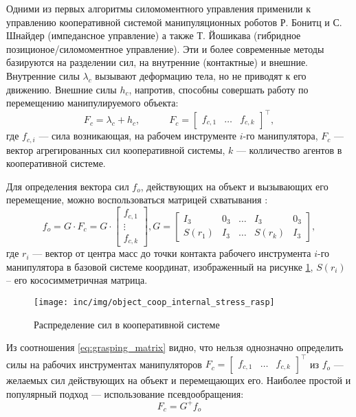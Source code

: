 Одними из первых алгоритмы силомоментного управления применили к управлению кооперативной системой манипуляционных роботов Р. Бонитц \cite{Bonitz1996} и С. Шнайдер \cite{Schneider1989}(импедансное управление) а также Т. Йошикава \cite{Yoshikawa1990}(гибридное позиционое/силомоментное управление). Эти и более современные методы базируются на разделении сил, на внутренние (контактные) и внешние. Внутренние силы $\lambda_c$ вызывают деформацию тела, но не приводят к его движению. Внешние силы $h_c$, напротив, способны совершать работу по перемещению манипулируемого объекта:
\begin{equation}
  F_c = \lambda_c + h_c, \qquad \quad F_c = \begin{bmatrix} f_{c,1} & \dots & f_{c,k} \end{bmatrix}^\top,
\end{equation}
где $f_{c,i}$ --- сила возникающая, на рабочем инструменте $i$-го манипулятора, $F_c$ --- вектор агрегированных сил кооперативной системы, $k$ --- колличество агентов в кооперативной системе.

Для определения вектора сил $f_o$, действующих на объект и вызывающих его перемещение, можно воспользоваться матрицей схватывания \cite{AzizZadeh2019}:
\begin{equation}
        f_o =  G \cdot F_c = G\cdot \begin{bmatrix} f_{c,1} \\ \vdots\\  f_{c,k}\end{bmatrix}, G = \begin{bmatrix} I_3& 0_3 & \dots &  I_3 & 0_3 \\ S(r_1) & I_3 & \dots &  S(r_k) & I_3\end{bmatrix},
        \label{eq:grasping_matrix}
\end{equation}
где $r_i$ --- вектор от центра масс до точки контакта рабочего инструмента $i$-го манипулятора в базовой системе координат, изображенный на рисунке \ref{coop_obj_handle_rasp}, $S(r_i)$ -- его кососимметричная матрица.

\begin{figure}[ht]
  \centering
  \texttt{[image: inc/img/object\_coop\_internal\_stress\_rasp]}
  \caption{Распределение сил в кооперативной системе}
  \label{coop_obj_handle_rasp}
\end{figure}

Из соотношения \eqref{eq:grasping_matrix} видно, что нельзя однозначно определить силы на рабочих инструментах манипуляторов $F_c =\begin{bmatrix} f_{c,1} & \dots & f_{c,k} \end{bmatrix}^\top$ из $f_o$ --- желаемых сил действующих на объект и перемещающих его. Наиболее простой и популярный подход --- использование псевдообращения:
\begin{equation}
  F_c = G^+ f_o
\end{equation}

